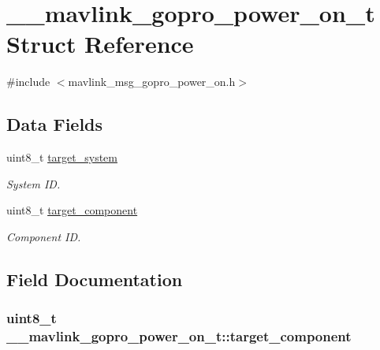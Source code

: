 \hypertarget{struct____mavlink__gopro__power__on__t}{\section{\+\_\+\+\_\+mavlink\+\_\+gopro\+\_\+power\+\_\+on\+\_\+t Struct Reference}
\label{struct____mavlink__gopro__power__on__t}
}


{\ttfamily \#include $<$mavlink\+\_\+msg\+\_\+gopro\+\_\+power\+\_\+on.\+h$>$}

\subsection*{Data Fields}
\begin{DoxyCompactItemize}
\item 
uint8\+\_\+t \hyperlink{struct____mavlink__gopro__power__on__t_a45ee6af4b3ca38f0244c4138f421aa1a}{target\+\_\+system}
\begin{DoxyCompactList}\small\item\em System I\+D. \end{DoxyCompactList}\item 
uint8\+\_\+t \hyperlink{struct____mavlink__gopro__power__on__t_ab9095679ae4ac8691ec8fdf145f670a3}{target\+\_\+component}
\begin{DoxyCompactList}\small\item\em Component I\+D. \end{DoxyCompactList}\end{DoxyCompactItemize}


\subsection{Field Documentation}
\hypertarget{struct____mavlink__gopro__power__on__t_ab9095679ae4ac8691ec8fdf145f670a3}{
\subsubsection[{target\+\_\+component}]{\setlength{\rightskip}{0pt plus 5cm}uint8\+\_\+t \+\_\+\+\_\+mavlink\+\_\+gopro\+\_\+power\+\_\+on\+\_\+t\+::target\+\_\+component}}\label{struct____mavlink__gopro__power__on__t_ab9095679ae4ac8691ec8fdf145f670a3}


